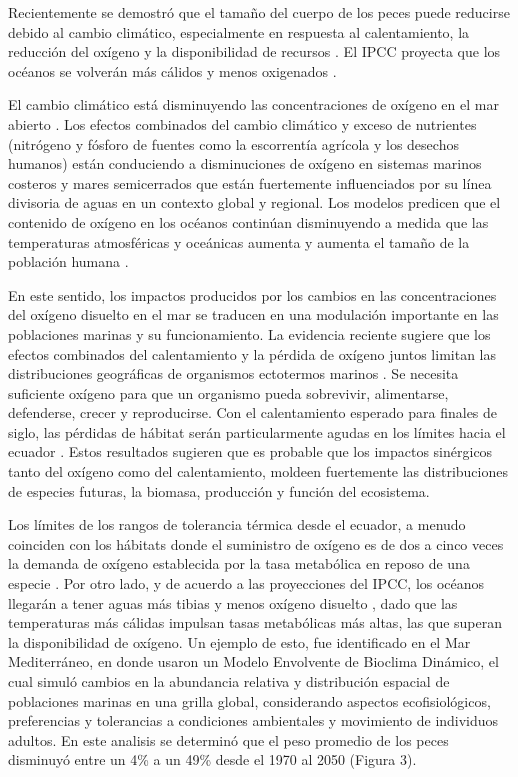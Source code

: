 \documentclass{umagthesis}
\begin{document}
Recientemente se demostró que el tamaño del cuerpo de los peces puede reducirse debido al cambio climático, especialmente en respuesta al calentamiento, la reducción del oxígeno y la disponibilidad de recursos \autocite{Cheung2013}. El IPCC proyecta que los océanos se volverán más cálidos y menos oxigenados \autocite{IPCC2014}.

El cambio climático está disminuyendo las concentraciones de oxígeno en el mar abierto \autocite{Isensee2016,Deutsch2015}. Los efectos combinados del cambio climático y exceso de nutrientes (nitrógeno y fósforo de fuentes como la escorrentía agrícola y los desechos humanos) están conduciendo a disminuciones de oxígeno en sistemas marinos costeros y mares semicerrados que están fuertemente influenciados por su línea divisoria de aguas en un contexto global y regional. Los modelos predicen que el contenido de oxígeno en los océanos continúan disminuyendo a medida que las temperaturas atmosféricas y oceánicas aumenta y aumenta el tamaño de la población humana \autocite{Isensee2016}.

En este sentido, los impactos producidos por los cambios en las concentraciones del oxígeno disuelto en el mar se traducen en una modulación importante en las poblaciones marinas y su funcionamiento. La evidencia reciente sugiere que los efectos combinados del calentamiento y la pérdida de oxígeno juntos limitan las distribuciones geográficas de organismos ectotermos marinos \autocite{Deutsch2015,Portner2001,Isensee2016}. Se necesita suficiente oxígeno para que un organismo pueda sobrevivir, alimentarse, defenderse, crecer y reproducirse. Con el calentamiento esperado para finales de siglo, las pérdidas de hábitat serán particularmente agudas en los límites hacia el ecuador \autocite{Deutsch2015}. Estos resultados sugieren que es probable que los impactos sinérgicos tanto del oxígeno como del calentamiento, moldeen fuertemente las distribuciones de especies futuras, la biomasa, producción y función del ecosistema.

Los límites de los rangos de tolerancia térmica desde el ecuador, a menudo coinciden con los hábitats donde el suministro de oxígeno es de dos a cinco veces la demanda de oxígeno establecida por la tasa metabólica en reposo de una especie \autocite{Deutsch2015}. Por otro lado, y de acuerdo a las proyecciones del IPCC, los océanos llegarán a tener aguas más tibias y menos oxígeno disuelto \autocite{IPCC2014}, dado que las temperaturas más cálidas impulsan tasas metabólicas más altas, las que superan la disponibilidad de oxígeno. Un ejemplo de esto, fue identificado en el Mar Mediterráneo, en donde \autocite{Cheung2013} usaron un Modelo Envolvente de Bioclima Dinámico, el cual simuló cambios en la abundancia relativa y distribución espacial de poblaciones marinas en una grilla global, considerando aspectos ecofisiológicos, preferencias y tolerancias a condiciones ambientales y movimiento de individuos adultos. En este analisis se determinó que el peso promedio de los peces disminuyó entre un 4\% a un 49\% desde el 1970 al 2050 (Figura 3).
\end{document}
